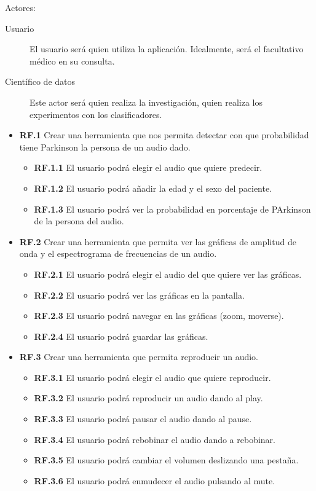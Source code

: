 Actores:
\begin{description}
\item[Usuario] El usuario será quien utiliza la aplicación. Idealmente, será el facultativo médico en su consulta.
\item[Científico de datos] Este actor será quien realiza la investigación, quien realiza los experimentos con los clasificadores.
\end{description}



\begin{itemize}
	\item \textbf{RF.1} Crear una herramienta que nos permita detectar con que probabilidad tiene Parkinson la persona de un audio dado.
	\begin{itemize}
	\item \textbf{RF.1.1} El usuario podrá elegir el audio que  quiere predecir.
	\item \textbf{RF.1.2} El usuario podrá añadir la edad y el sexo del paciente.
	\item \textbf{RF.1.3} El usuario podrá ver la probabilidad en porcentaje de PArkinson de la persona del audio.
	\end{itemize}
	
	\item \textbf{RF.2} Crear una herramienta que permita ver las gráficas de amplitud de onda y el espectrograma de frecuencias de un audio.
	\begin{itemize}
	\item \textbf{RF.2.1} El usuario podrá elegir el audio del que quiere ver las gráficas.
	\item \textbf{RF.2.2} El usuario podrá ver las gráficas en la pantalla.
	\item \textbf{RF.2.3} El usuario podrá navegar en las gráficas (zoom, moverse).
	\item \textbf{RF.2.4} El usuario podrá guardar las gráficas.
	\end{itemize}
	
	\item \textbf{RF.3} Crear una herramienta que permita reproducir un audio.
	\begin{itemize}
	\item \textbf{RF.3.1} El usuario podrá elegir el audio que quiere reproducir.
	\item \textbf{RF.3.2} El usuario podrá reproducir un audio dando al play.
	\item \textbf{RF.3.3} El usuario podrá pausar el audio dando al pause.
	\item \textbf{RF.3.4} El usuario podrá rebobinar el audio dando a rebobinar.
	\item \textbf{RF.3.5} El usuario podrá cambiar el volumen deslizando una pestaña.
	\item \textbf{RF.3.6} El usuario podrá enmudecer el audio pulsando al mute.
	\end{itemize}
	

\end{itemize}
